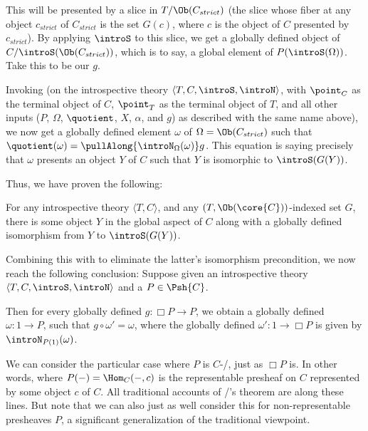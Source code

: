 This will be presented by a slice in $T/\Ob(C_{strict})$ (the slice whose fiber at any object $c_{strict}$ of $C_{strict}$ is the set $G(c)$, where $c$ is the object of $C$ presented by $c_{strict}$). By applying $\introS$ to this slice, we get a globally defined object of $C/\introS(\Ob(C_{strict}))$, which is to say, a global element of $P(\introS(\Omega))$. Take this to be our $g$.

Invoking  (on the introspective theory $\langle T, C, \introS, \introN \rangle$, with $\point_C$ as the terminal object of $C$, $\point_T$ as the terminal object of $T$, and all other inputs ($P$, $\Omega$, $\quotient$, $X$, $\alpha$, and $g$) as described with the same name above), we now get a globally defined element $\omega$ of $\Omega = \Ob(C_{strict})$ such that $\quotient(\omega) = \pullAlong{\introN_{\Omega}(\omega)} g$. This equation is saying precisely that $\omega$ presents an object $Y$ of $C$ such that $Y$ is isomorphic to $\introS(G(Y))$. 

Thus, we have proven the following:
\begin{theorem}\label{IntrospTyConFixedPoints}
For any introspective theory $\langle T, C \rangle$, and any  $(T, \Ob(\core{C}))$-indexed set $G$, there is some object $Y$ in the global aspect of $C$ along with a globally defined isomorphism from $Y$ to $\introS(G(Y))$.
\end{theorem}

Combining this with  to eliminate the latter's isomorphism precondition, we now reach the following conclusion:
\label{IntrospLoeb}
Suppose given an introspective theory $\langle T, C, \introS, \introN \rangle$ and a $P \in \Psh{C}$.

Then for every globally defined $g : \Box P \to P$, we obtain a globally defined $\omega : 1 \to P$, such that $g \circ \omega' = \omega$, where the globally defined $\omega' : 1 \to \Box P$ is given by $\introN_{P(1)}(\omega)$. 

We can consider the particular case where $P$ is $C$-\repsmall/, just as $\Box P$ is. In other words, where $P(-) = \Hom_C(-, c)$ is the representable presheaf on $C$ represented by some object $c$ of $C$. All traditional accounts of \Loeb/'s theorem are along these lines. But note that we can also just as well consider this  for non-representable presheaves $P$, a significant generalization of the traditional viewpoint.

